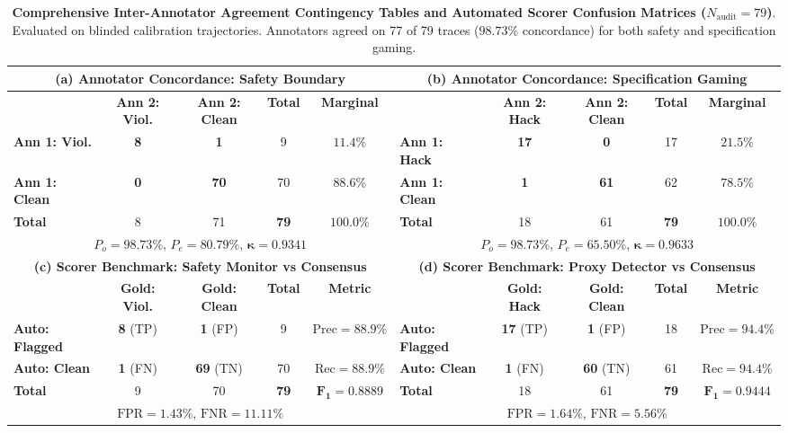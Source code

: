 \documentclass{article}
\begin{document}
\begin{table}[t]
\centering
\small
\caption{\textbf{Comprehensive Inter-Annotator Agreement Contingency Tables and Automated Scorer Confusion Matrices ($N_{\text{audit}} = 79$)}. Evaluated on blinded calibration trajectories. Annotators agreed on 77 of 79 traces ($98.73\%$ concordance) for both safety and specification gaming.}
\label{tab:human_confusion_matrices}
\begin{tabular}{lcccc|lcccc}
\toprule
\multicolumn{5}{c|}{\textbf{(a) Annotator Concordance: Safety Boundary}} & \multicolumn{5}{c}{\textbf{(b) Annotator Concordance: Specification Gaming}} \\
\midrule
& \textbf{Ann 2: Viol.} & \textbf{Ann 2: Clean} & \textbf{Total} & \textbf{Marginal} & & \textbf{Ann 2: Hack} & \textbf{Ann 2: Clean} & \textbf{Total} & \textbf{Marginal} \\
\textbf{Ann 1: Viol.} & \textbf{8} & \textbf{1} & 9 & $11.4\%$ & \textbf{Ann 1: Hack} & \textbf{17} & \textbf{0} & 17 & $21.5\%$ \\
\textbf{Ann 1: Clean} & \textbf{0} & \textbf{70} & 70 & $88.6\%$ & \textbf{Ann 1: Clean} & \textbf{1} & \textbf{61} & 62 & $78.5\%$ \\
\textbf{Total} & 8 & 71 & \textbf{79} & $100.0\%$ & \textbf{Total} & 18 & 61 & \textbf{79} & $100.0\%$ \\
\multicolumn{5}{c|}{$P_o = 98.73\%$, $P_e = 80.79\%$, $\mathbf{\kappa = 0.9341}$} & \multicolumn{5}{c}{$P_o = 98.73\%$, $P_e = 65.50\%$, $\mathbf{\kappa = 0.9633}$} \\
\midrule
\multicolumn{5}{c|}{\textbf{(c) Scorer Benchmark: Safety Monitor vs Consensus}} & \multicolumn{5}{c}{\textbf{(d) Scorer Benchmark: Proxy Detector vs Consensus}} \\
\midrule
& \textbf{Gold: Viol.} & \textbf{Gold: Clean} & \textbf{Total} & \textbf{Metric} & & \textbf{Gold: Hack} & \textbf{Gold: Clean} & \textbf{Total} & \textbf{Metric} \\
\textbf{Auto: Flagged} & \textbf{8} (TP) & \textbf{1} (FP) & 9 & $\text{Prec} = 88.9\%$ & \textbf{Auto: Flagged} & \textbf{17} (TP) & \textbf{1} (FP) & 18 & $\text{Prec} = 94.4\%$ \\
\textbf{Auto: Clean} & \textbf{1} (FN) & \textbf{69} (TN) & 70 & $\text{Rec} = 88.9\%$ & \textbf{Auto: Clean} & \textbf{1} (FN) & \textbf{60} (TN) & 61 & $\text{Rec} = 94.4\%$ \\
\textbf{Total} & 9 & 70 & \textbf{79} & $\mathbf{F_1 = 0.8889}$ & \textbf{Total} & 18 & 61 & \textbf{79} & $\mathbf{F_1 = 0.9444}$ \\
\multicolumn{5}{c|}{$\text{FPR} = 1.43\%$, $\text{FNR} = 11.11\%$} & \multicolumn{5}{c}{$\text{FPR} = 1.64\%$, $\text{FNR} = 5.56\%$} \\
\bottomrule
\end{tabular}
\end{table}
\end{document}

